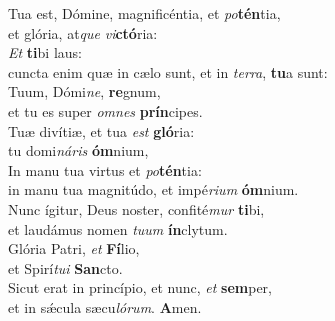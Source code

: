 \evenverse Tua est, Dómine, magnificéntia, et \textit{po}\textbf{tén}tia,~\*\\
\evenverse et glória, at\textit{que} \textit{vi}\textbf{ctó}ria:\\
\oddverse \textit{Et} \textbf{ti}bi laus:~\*\\
\oddverse cuncta enim quæ in cælo sunt, et in \textit{ter}\textit{ra}, \textbf{tu}a sunt:\\
\evenverse Tuum, Dómi\textit{ne}, \textbf{re}gnum,~\*\\
\evenverse et tu es super \textit{om}\textit{nes} \textbf{prín}cipes.\\
\oddverse Tuæ divítiæ, et tua \textit{est} \textbf{gló}ria:~\*\\
\oddverse tu domi\textit{ná}\textit{ris} \textbf{óm}nium,\\
\evenverse In manu tua virtus et \textit{po}\textbf{tén}tia:~\*\\
\evenverse in manu tua magnitúdo, et impé\textit{ri}\textit{um} \textbf{óm}nium.\\
\oddverse Nunc ígitur, Deus noster, confité\textit{mur} \textbf{ti}bi,~\*\\
\oddverse et laudámus nomen \textit{tu}\textit{um} \textbf{ín}clytum.\\
\evenverse Glória Patri, \textit{et} \textbf{Fí}lio,~\*\\
\evenverse et Spirí\textit{tu}\textit{i} \textbf{San}cto.\\
\oddverse Sicut erat in princípio, et nunc, \textit{et} \textbf{sem}per,~\*\\
\oddverse et in sǽcula sæcu\textit{ló}\textit{rum}. \textbf{A}men.\\
